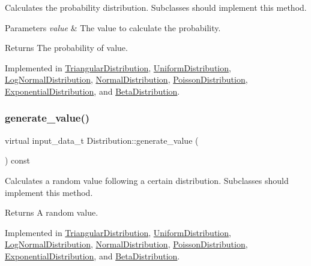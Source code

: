 Calculates the probability distribution. Subclasses should implement this method. 
\begin{DoxyParams}{Parameters}
{\em value} & The value to calculate the probability. \\
\hline
\end{DoxyParams}
\begin{DoxyReturn}{Returns}
The probability of value. 
\end{DoxyReturn}


Implemented in \hyperlink{classTriangularDistribution_a32419db37453948870df589d6c4abf3d}{Triangular\+Distribution}, \hyperlink{classUniformDistribution_a3bf3390b5717b5958e36726b12aa953b}{Uniform\+Distribution}, \hyperlink{classLogNormalDistribution_aa4a17cea478421db3a75e0728a63c371}{Log\+Normal\+Distribution}, \hyperlink{classNormalDistribution_a6041c54ace5ecc585fdef3d21386e831}{Normal\+Distribution}, \hyperlink{classPoissonDistribution_ae3eb709210bb2dcae5f41c6fdccede44}{Poisson\+Distribution}, \hyperlink{classExponentialDistribution_a1bf7a6f5d124a053934654af1e70f9bc}{Exponential\+Distribution}, and \hyperlink{classBetaDistribution_aa4c1f6ab287cadbefc1f955f9d7f4f42}{Beta\+Distribution}.

\mbox{\label{classDistribution_a096af8a5e59bd38e0ad7da10632e0c83}} 
\subsubsection{\texorpdfstring{generate\+\_\+value()}{generate\_value()}}
{\footnotesize\ttfamily virtual input\+\_\+data\+\_\+t Distribution\+::generate\+\_\+value (\begin{DoxyParamCaption}{ }\end{DoxyParamCaption}) const\hspace{0.3cm}{\ttfamily [pure virtual]}}

Calculates a random value following a certain distribution. Subclasses should implement this method. \begin{DoxyReturn}{Returns}
A random value. 
\end{DoxyReturn}


Implemented in \hyperlink{classTriangularDistribution_a2fd4ac4297a82fc223cdb0d3a81408cb}{Triangular\+Distribution}, \hyperlink{classUniformDistribution_a3a5482105f2b3cabc7a2cc33ce27c1ea}{Uniform\+Distribution}, \hyperlink{classLogNormalDistribution_a3c4f651b46cfec8372671ab32889a0c7}{Log\+Normal\+Distribution}, \hyperlink{classNormalDistribution_a147f7de64cc0d8eb98a44a4aa1187ec2}{Normal\+Distribution}, \hyperlink{classPoissonDistribution_a8d8c1d669615f2259af239df01550f7d}{Poisson\+Distribution}, \hyperlink{classExponentialDistribution_a00e0abeff4f9e4cc64926de49d027711}{Exponential\+Distribution}, and \hyperlink{classBetaDistribution_ad2cb0829f67c4c5d508960b2f39439da}{Beta\+Distribution}.

